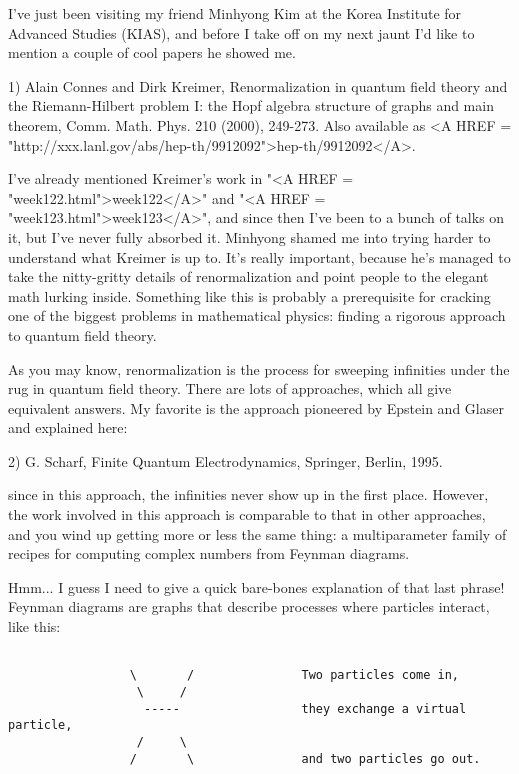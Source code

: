 


I've just been visiting my friend Minhyong Kim at the Korea Institute
for Advanced Studies (KIAS), and before I take off on my next jaunt I'd 
like to mention a couple of cool papers he showed me. 

1) Alain Connes and Dirk Kreimer, Renormalization in quantum field 
theory and the Riemann-Hilbert problem I: the Hopf algebra structure 
of graphs and main theorem, Comm. Math. Phys. 210 (2000), 249-273.
Also available as <A HREF = "http://xxx.lanl.gov/abs/hep-th/9912092">hep-th/9912092</A>.

I've already mentioned Kreimer's work in "<A HREF = "week122.html">week122</A>" 
and "<A HREF = "week123.html">week123</A>", 
and since then I've been to a bunch of talks on it, but I've never 
fully absorbed it.  Minhyong shamed me into trying harder to 
understand what Kreimer is up to.  It's really important, because
he's managed to take the nitty-gritty details of renormalization
and point people to the elegant math lurking inside.  Something like 
this is probably a prerequisite for cracking one of the biggest 
problems in mathematical physics: finding a rigorous approach to 
quantum field theory. 
 
As you may know, renormalization is the process for sweeping
infinities under the rug in quantum field theory.  There are 
lots of approaches, which all give equivalent answers.   My
favorite is the approach pioneered by Epstein and Glaser and 
explained here:

2) G. Scharf, Finite Quantum Electrodynamics, Springer, Berlin, 1995. 

since in this approach, the infinities never show up in the first 
place.  However, the work involved in this approach is comparable 
to that in other approaches, and you wind up getting more or less
the same thing: a multiparameter family of recipes for computing 
complex numbers from Feynman diagrams.  

Hmm... I guess I need to give a quick bare-bones explanation of
that last phrase!  Feynman diagrams are graphs that describe 
processes where particles interact, like this:


\begin{verbatim}

                 \       /               Two particles come in,
                  \     / 
                   -----                 they exchange a virtual particle,
                  /     \
                 /       \               and two particles go out.
\end{verbatim}
    

